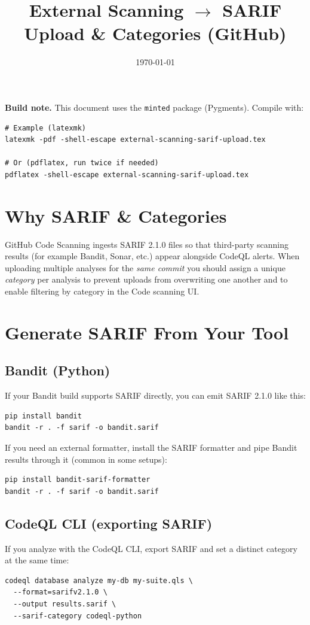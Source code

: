 \documentclass[11pt,a4paper]{article}
\title{External Scanning $\rightarrow$ SARIF Upload \& Categories (GitHub)}
\author{}
\date{\today}
\newcommand{\term}[1]{\texttt{#1}}
\begin{document}
\maketitle

\noindent\textbf{Build note.} This document uses the \term{minted} package (Pygments). Compile with:
\begin{verbatim}
# Example (latexmk)
latexmk -pdf -shell-escape external-scanning-sarif-upload.tex

# Or (pdflatex, run twice if needed)
pdflatex -shell-escape external-scanning-sarif-upload.tex
\end{verbatim}

\section{Why SARIF \& Categories}
GitHub Code Scanning ingests SARIF 2.1.0 files so that third-party scanning results (for example Bandit, Sonar, etc.) appear alongside CodeQL alerts. When uploading multiple analyses for the \emph{same commit} you should assign a unique \emph{category} per analysis to prevent uploads from overwriting one another and to enable filtering by category in the Code scanning UI.

\section{Generate SARIF From Your Tool}
\subsection{Bandit (Python)}
If your Bandit build supports SARIF directly, you can emit SARIF 2.1.0 like this:
\begin{verbatim}
pip install bandit
bandit -r . -f sarif -o bandit.sarif
\end{verbatim}

If you need an external formatter, install the SARIF formatter and pipe Bandit results through it (common in some setups):
\begin{verbatim}
pip install bandit-sarif-formatter
bandit -r . -f sarif -o bandit.sarif
\end{verbatim}

\subsection{CodeQL CLI (exporting SARIF)}
If you analyze with the CodeQL CLI, export SARIF and set a distinct category at the same time:
\begin{verbatim}
codeql database analyze my-db my-suite.qls \
  --format=sarifv2.1.0 \
  --output results.sarif \
  --sarif-category codeql-python
\end{verbatim}
\end{document}
